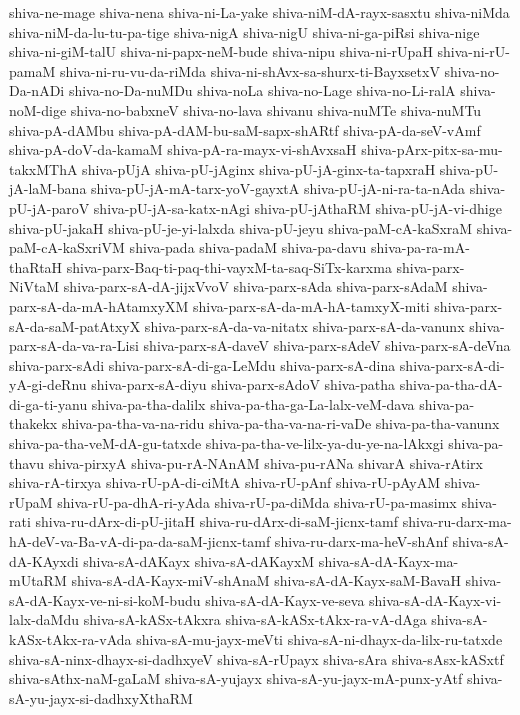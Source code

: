 {shiva-ne-mage
shiva-nena
shiva-ni-La-yake
shiva-niM-dA-rayx-sasxtu
shiva-niMda
shiva-niM-da-lu-tu-pa-tige
shiva-nigA
shiva-nigU
shiva-ni-ga-piRsi
shiva-nige
shiva-ni-giM-talU
shiva-ni-papx-neM-bude
shiva-nipu
shiva-ni-rUpaH
shiva-ni-rU-pamaM
shiva-ni-ru-vu-da-riMda
shiva-ni-shAvx-sa-shurx-ti-BayxsetxV
shiva-no-Da-nADi
shiva-no-Da-nuMDu
shiva-noLa
shiva-no-Lage
shiva-no-Li-ralA
shiva-noM-dige
shiva-no-babxneV
shiva-no-lava
shivanu
shiva-nuMTe
shiva-nuMTu
shiva-pA-dAMbu
shiva-pA-dAM-bu-saM-sapx-shARtf
shiva-pA-da-seV-vAmf
shiva-pA-doV-da-kamaM
shiva-pA-ra-mayx-vi-shAvxsaH
shiva-pArx-pitx-sa-mu-takxMThA
shiva-pUjA
shiva-pU-jAginx
shiva-pU-jA-ginx-ta-tapxraH
shiva-pU-jA-laM-bana
shiva-pU-jA-mA-tarx-yoV-gayxtA
shiva-pU-jA-ni-ra-ta-nAda
shiva-pU-jA-paroV
shiva-pU-jA-sa-katx-nAgi
shiva-pU-jAthaRM
shiva-pU-jA-vi-dhige
shiva-pU-jakaH
shiva-pU-je-yi-lalxda
shiva-pU-jeyu
shiva-paM-cA-kaSxraM
shiva-paM-cA-kaSxriVM
shiva-pada
shiva-padaM
shiva-pa-davu
shiva-pa-ra-mA-thaRtaH
shiva-parx-Baq-ti-paq-thi-vayxM-ta-saq-SiTx-karxma
shiva-parx-NiVtaM
shiva-parx-sA-dA-jijxVvoV
shiva-parx-sAda
shiva-parx-sAdaM
shiva-parx-sA-da-mA-hAtamxyXM
shiva-parx-sA-da-mA-hA-tamxyX-miti
shiva-parx-sA-da-saM-patAtxyX
shiva-parx-sA-da-va-nitatx
shiva-parx-sA-da-vanunx
shiva-parx-sA-da-va-ra-Lisi
shiva-parx-sA-daveV
shiva-parx-sAdeV
shiva-parx-sA-deVna
shiva-parx-sAdi
shiva-parx-sA-di-ga-LeMdu
shiva-parx-sA-dina
shiva-parx-sA-di-yA-gi-deRnu
shiva-parx-sA-diyu
shiva-parx-sAdoV
shiva-patha
shiva-pa-tha-dA-di-ga-ti-yanu
shiva-pa-tha-dalilx
shiva-pa-tha-ga-La-lalx-veM-dava
shiva-pa-thakekx
shiva-pa-tha-va-na-ridu
shiva-pa-tha-va-na-ri-vaDe
shiva-pa-tha-vanunx
shiva-pa-tha-veM-dA-gu-tatxde
shiva-pa-tha-ve-lilx-ya-du-ye-na-lAkxgi
shiva-pa-thavu
shiva-pirxyA
shiva-pu-rA-NAnAM
shiva-pu-rANa
shivarA
shiva-rAtirx
shiva-rA-tirxya
shiva-rU-pA-di-ciMtA
shiva-rU-pAnf
shiva-rU-pAyAM
shiva-rUpaM
shiva-rU-pa-dhA-ri-yAda
shiva-rU-pa-diMda
shiva-rU-pa-masimx
shiva-rati
shiva-ru-dArx-di-pU-jitaH
shiva-ru-dArx-di-saM-jicnx-tamf
shiva-ru-darx-ma-hA-deV-va-Ba-vA-di-pa-da-saM-jicnx-tamf
shiva-ru-darx-ma-heV-shAnf
shiva-sA-dA-KAyxdi
shiva-sA-dAKayx
shiva-sA-dAKayxM
shiva-sA-dA-Kayx-ma-mUtaRM
shiva-sA-dA-Kayx-miV-shAnaM
shiva-sA-dA-Kayx-saM-BavaH
shiva-sA-dA-Kayx-ve-ni-si-koM-budu
shiva-sA-dA-Kayx-ve-seva
shiva-sA-dA-Kayx-vi-lalx-daMdu
shiva-sA-kASx-tAkxra
shiva-sA-kASx-tAkx-ra-vA-dAga
shiva-sA-kASx-tAkx-ra-vAda
shiva-sA-mu-jayx-meVti
shiva-sA-ni-dhayx-da-lilx-ru-tatxde
shiva-sA-ninx-dhayx-si-dadhxyeV
shiva-sA-rUpayx
shiva-sAra
shiva-sAsx-kASxtf
shiva-sAthx-naM-gaLaM
shiva-sA-yujayx
shiva-sA-yu-jayx-mA-punx-yAtf
shiva-sA-yu-jayx-si-dadhxyXthaRM
}
